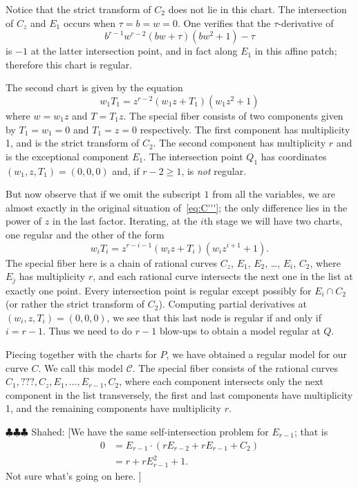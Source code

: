 \documentclass{article}
\newcommand{\shahed}[1]{{\color{Purple} \sf $\clubsuit\clubsuit\clubsuit$ Shahed: [#1]}}
\newcommand{\scd}{\mathscr{C}}
\theoremstyle{plain}
\theoremstyle{definition}
\theoremstyle{remark}
\begin{document}
Notice that the strict transform of $C_2$ does not lie in this chart. The intersection of $C_z$ and $E_1$ occurs when $\tau = b = w = 0$. One verifies that the $\tau$-derivative of 
\[
b^{r-1}w^{r-2}(bw + \tau)(bw^2 + 1) - \tau
\]
is $-1$ at the latter intersection point, and in fact along $E_1$ in this affine patch; therefore this chart is regular.

The second chart is given by the equation
\[
w_1 T_1 = z^{r-2}(w_1z + T_1)(w_1 z^2 + 1)
\]
where $w = w_1 z$ and $T = T_1 z$. The special fiber consists of two components given by $T_1 = w_1 = 0$ and $T_1 = z = 0$ respectively. The first component has multiplicity 1, and is the strict transform of $C_2$. The second component has multiplicity $r$ and is the exceptional component $E_{1}$. The intersection point $Q_1$ has coordinates $(w_1, z, T_1) = (0,0,0)$ and, if $r - 2 \geq 1$, is \emph{not} regular.

But now observe that if we omit the subscript $1$ from all the variables, we are almost exactly in the original situation of~\eqref{eq:C'''}; the only difference lies in the power of $z$ in the last factor. Iterating, at the $i$th stage we will have two charts, one regular and the other of the form
\[
w_i T_i = z^{r-i-1}(w_iz + T_i)(w_i z^{i+1} + 1).
\]
The special fiber here is a chain of rational curves ${C_z}$, $E_{1}$, $E_{2}$, \dots, $E_{i}$, ${C_2}$, where $E_j$ has multiplicity $r$, and each rational curve intersects the next one in the list at exactly one point. Every intersection point is regular except possibly for $E_{i} \cap C_2$ (or rather the strict transform of $C_2$). Computing partial derivatives at $(w_i, z, T_i) = (0,0,0)$, we see that this last node is regular if and only if $i = r - 1$. Thus we need to do $r - 1$ blow-ups to obtain a model regular at $Q$.

Piecing together with the charts for $P$, we have obtained a regular model for our curve $C$. We call this model $\scd$. The special fiber consists of the rational curves $C_1, ???, C_z, E_1, \dots, E_{r-1}, C_2$, where each component intersects only the next component in the list transversely, the first and last components have multiplicity 1, and the remaining components have multiplicity $r$.

\shahed{We have the same self-intersection problem for $E_{r-1}$; that is
  \begin{align*}
    0 &= E_{r-1} \cdot (rE_{r-2} + rE_{r-1} + C_2) \\
    &= r + r E_{r-1}^2 + 1.
  \end{align*}
  Not sure what's going on here.
  }
\end{document}
